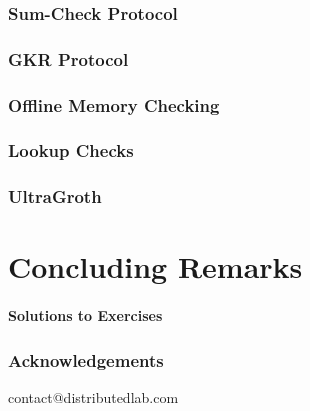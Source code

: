 \documentclass{zkdl-template}
\begin{document}
    

    \section{Sum-Check Protocol}\label{section:sumcheck}
    

    \section{GKR Protocol}\label{section:gkr}
    
    
    \section{Offline Memory Checking}\label{section:toolkit}
    

    \section{Lookup Checks}\label{section:lookups}
    

    \section{UltraGroth}\label{section:ultragroth}
    
    
    \part{Concluding Remarks}\label{section:solutions}
    \subsection*{Solutions to Exercises}
    

    \section{Acknowledgements}
    


     
    


    \newpage
    \pagestyle{empty}

    \ifodd\value{page}
        \newpage
    \fi

    \vspace*{\fill}

    \begin{center}
        contact@distributedlab.com
    \end{center}

    \vspace*{\fill}
\end{document}
